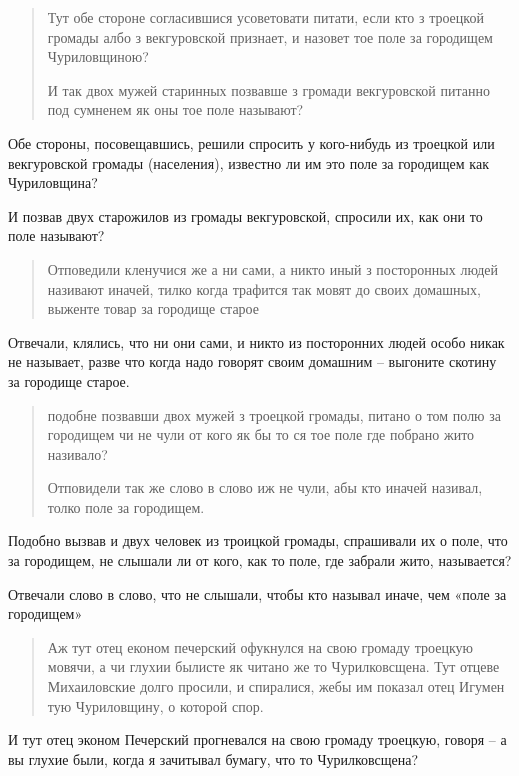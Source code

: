 \begin{quotation}
Тут обе стороне согласившися усоветовати питати, если кто з троецкой громады албо з векгуровской признает, и назовет тое поле за городищем Чуриловщиною?

И так двох мужей старинных позвавше з громади векгуровской питанно под сумненем як оны тое поле называют?
\end{quotation}

Обе стороны, посовещавшись, решили спросить у кого-нибудь из троецкой или векгуровской громады (населения), известно ли им это поле за городищем как Чуриловщина?

И позвав двух старожилов из громады векгуровской, спросили их, как они то поле называют? 

\begin{quotation}
Отповедили кленучися же а ни сами, а никто иный з посторонных людей називают иначей, тилко когда трафится так мовят до своих домашных, выженте товар за городище старое 
\end{quotation}

Отвечали, клялись, что ни они сами, и никто из посторонних людей особо никак не называет, разве что когда надо говорят своим домашним – выгоните скотину за городище старое.

\begin{quotation}
подобне позвавши двох мужей з троецкой громады, питано о том полю за городищем чи не чули от кого як бы то ся тое поле где побрано жито називало?

Отповидели так же слово в слово иж не чули, абы кто иначей називал, толко поле за городищем.
\end{quotation}

Подобно вызвав и двух человек из троицкой громады, спрашивали их о поле, что за городищем, не слышали ли от кого, как то поле, где забрали жито, называется?

Отвечали слово в слово, что не слышали, чтобы кто называл иначе, чем «поле за городищем»

\begin{quotation}
Аж тут отец економ печерский офукнулся на свою громаду троецкую мовячи, а чи глухии былисте як читано же то Чурилковсщена. Тут отцеве Михаиловские долго просили, и спиралися, жебы им показал отец Игумен тую Чуриловщину, о которой спор.
\end{quotation}

И тут отец эконом Печерский прогневался на свою громаду троецкую, говоря – а вы глухие были, когда я зачитывал бумагу, что то Чурилковсщена? 

